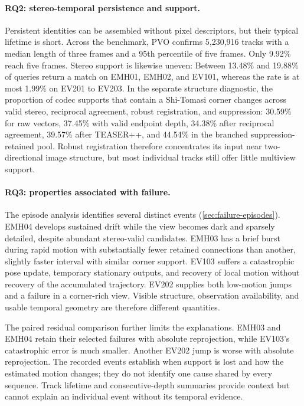 \paragraph{RQ2: stereo-temporal persistence and support.}
Persistent identities can be assembled without pixel descriptors, but their
typical lifetime is short. Across the benchmark, PVO confirms
5,230,916 tracks with a median length of three frames and a 95th percentile of
five frames. Only 9.92\% reach five frames. Stereo support is likewise uneven:
Between 13.48\% and 19.88\% of queries return a match on EMH01, EMH02, and EV101, whereas
the rate is at most 1.99\% on EV201 to EV203. In the separate structure
diagnostic, the proportion of codec supports that contain a Shi-Tomasi corner
changes across valid stereo, reciprocal agreement, robust registration, and
suppression: 30.59\% for raw vectors, 37.45\% with valid endpoint depth, 34.38\%
after reciprocal agreement, 39.57\% after TEASER++, and 44.54\% in the branched
suppression-retained pool. Robust registration therefore concentrates its input
near two-directional image structure, but most individual tracks still offer
little multiview support.

\paragraph{RQ3: properties associated with failure.}
The episode analysis identifies several distinct events
(\autoref{sec:failure-episodes}). EMH04 develops sustained drift while the
view becomes dark and sparsely detailed, despite abundant stereo-valid
candidates. EMH03 has a brief burst during rapid motion with substantially
fewer retained connections than another, slightly faster interval with similar
corner support. EV103 suffers a catastrophic pose update, temporary stationary
outputs, and recovery of local motion without recovery of the accumulated
trajectory. EV202 supplies both low-motion jumps and a failure in a
corner-rich view. Visible structure, observation availability, and usable
temporal geometry are therefore different quantities.

The paired residual comparison further limits the explanations. EMH03 and
EMH04 retain their selected failures with absolute reprojection, while EV103's
catastrophic error is much smaller. Another EV202 jump is worse with absolute
reprojection. The recorded events establish when support is lost and how the
estimated motion changes; they do not identify one cause shared by every
sequence. Track lifetime and consecutive-depth summaries provide context but
cannot explain an individual event without its temporal evidence.

